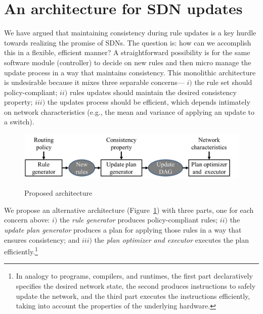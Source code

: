 \section{An architecture for SDN updates}
\label{sec:discussion}


We have argued that maintaining consistency during rule updates is a key hurdle towards realizing the promise of SDNs. The question is: how can we accomplish this in a flexible, efficient manner? A straightforward possibility is for the same software module (controller) to decide on new rules and then micro manage the update process in a way that maintains consistency. This monolithic architecture is undesirable because it mixes three separable concerns--- $i)$ the rule set should policy-compliant; $ii)$ rules updates should maintain the desired consistency property; $iii)$ the updates process should be efficient, which depends intimately on network characteristics (e.g., the mean and variance of applying an update to a switch).

\begin{figure}[t!]
  \centering
  \includegraphics[width=\columnwidth]{figures/arch.png}\\
  \caption{Proposed architecture}\label{fig:arch}
\end{figure}



We propose an alternative architecture (Figure~\ref{fig:arch}) with three parts, one for each concern above: $i)$ the {\em rule generator} produces policy-compliant rules; $ii)$ the {\em update plan generator} produces a plan for applying those rules in a way that ensures consistency; and $iii)$  the {\em plan optimizer and executor} executes the plan efficiently.\footnote{In analogy to programs, compilers, and runtimes, the first part declaratively specifies the desired network state, the second produces instructions to safely update the network, and the third part executes the instructions efficiently, taking into account the properties of the underlying hardware.}

